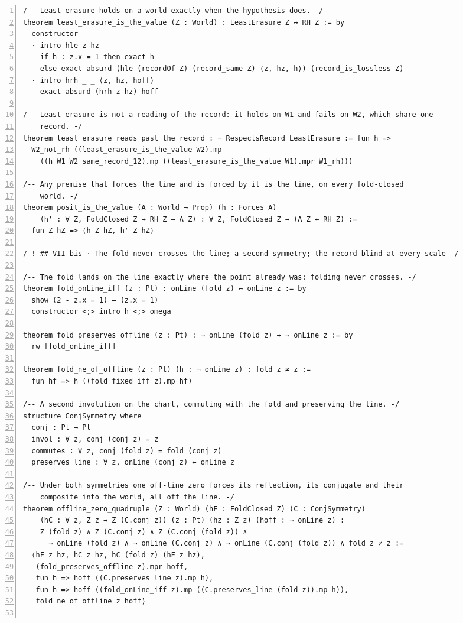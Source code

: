 \documentclass[10pt]{article}
\newcommand{\leansize}{\fontsize{5.5pt}{6.75pt}\selectfont}
\begin{document}
\begin{multicols}{2}
\begin{Verbatim}[numbers=left,firstnumber=1,numbersep=3pt,xleftmargin=2.6em,breaklines=true,breakanywhere=true,breakautoindent=false,breakindent=1.4em,breaksymbolleft={},breakanywheresymbolpre={},fontsize=\leansize]
/-- Least erasure holds on a world exactly when the hypothesis does. -/
theorem least_erasure_is_the_value (Z : World) : LeastErasure Z ↔ RH Z := by
  constructor
  · intro hle z hz
    if h : z.x = 1 then exact h
    else exact absurd (hle (recordOf Z) (record_same Z) ⟨z, hz, h⟩) (record_is_lossless Z)
  · intro hrh _ _ ⟨z, hz, hoff⟩
    exact absurd (hrh z hz) hoff

/-- Least erasure is not a reading of the record: it holds on W1 and fails on W2, which share one
    record. -/
theorem least_erasure_reads_past_the_record : ¬ RespectsRecord LeastErasure := fun h =>
  W2_not_rh ((least_erasure_is_the_value W2).mp
    ((h W1 W2 same_record_12).mp ((least_erasure_is_the_value W1).mpr W1_rh)))

/-- Any premise that forces the line and is forced by it is the line, on every fold-closed
    world. -/
theorem posit_is_the_value (A : World → Prop) (h : Forces A)
    (h' : ∀ Z, FoldClosed Z → RH Z → A Z) : ∀ Z, FoldClosed Z → (A Z ↔ RH Z) :=
  fun Z hZ => ⟨h Z hZ, h' Z hZ⟩

/-! ## VII-bis · The fold never crosses the line; a second symmetry; the record blind at every scale -/

/-- The fold lands on the line exactly where the point already was: folding never crosses. -/
theorem fold_onLine_iff (z : Pt) : onLine (fold z) ↔ onLine z := by
  show (2 - z.x = 1) ↔ (z.x = 1)
  constructor <;> intro h <;> omega

theorem fold_preserves_offline (z : Pt) : ¬ onLine (fold z) ↔ ¬ onLine z := by
  rw [fold_onLine_iff]

theorem fold_ne_of_offline (z : Pt) (h : ¬ onLine z) : fold z ≠ z :=
  fun hf => h ((fold_fixed_iff z).mp hf)

/-- A second involution on the chart, commuting with the fold and preserving the line. -/
structure ConjSymmetry where
  conj : Pt → Pt
  invol : ∀ z, conj (conj z) = z
  commutes : ∀ z, conj (fold z) = fold (conj z)
  preserves_line : ∀ z, onLine (conj z) ↔ onLine z

/-- Under both symmetries one off-line zero forces its reflection, its conjugate and their
    composite into the world, all off the line. -/
theorem offline_zero_quadruple (Z : World) (hF : FoldClosed Z) (C : ConjSymmetry)
    (hC : ∀ z, Z z → Z (C.conj z)) (z : Pt) (hz : Z z) (hoff : ¬ onLine z) :
    Z (fold z) ∧ Z (C.conj z) ∧ Z (C.conj (fold z)) ∧
      ¬ onLine (fold z) ∧ ¬ onLine (C.conj z) ∧ ¬ onLine (C.conj (fold z)) ∧ fold z ≠ z :=
  ⟨hF z hz, hC z hz, hC (fold z) (hF z hz),
   (fold_preserves_offline z).mpr hoff,
   fun h => hoff ((C.preserves_line z).mp h),
   fun h => hoff ((fold_onLine_iff z).mp ((C.preserves_line (fold z)).mp h)),
   fold_ne_of_offline z hoff⟩


\end{Verbatim}
\end{multicols}
\end{document}
